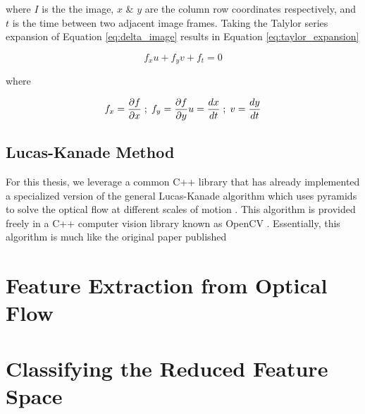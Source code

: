 where $I$ is the the image, $x$ \& $y$ are the column row coordinates respectively,
and $t$ is the time between two adjacent image frames. Taking the Talylor
series expansion of Equation \ref{eq:delta_image} results in Equation \ref{eq:taylor_expansion}


\begin{equation}
f_x u + f_y v + f_t = 0
\label{eq:taylor_expansion}
\end{equation}

where

\begin{equation}
f_x = \frac{\partial f}{\partial x} \; ; \; f_y = \frac{\partial f}{\partial y} \\
u = \frac{dx}{dt} \; ; \; v = \frac{dy}{dt}
\label{eq:taylor_expansion_partial}
\end{equation}


\subsection{\label{subsection:lucas_kanade} Lucas-Kanade Method}
For this thesis, we leverage a common C++ library that has already implemented
a specialized version of the general Lucas-Kanade algorithm which uses pyramids
to solve the optical flow at different scales of motion
 \cite{bouguet2001pyramidal}. This algorithm is provided freely in a C++ computer
 vision library known as OpenCV \cite{itseez2015opencv}. Essentially, this algorithm is much like the original
 paper published


\section{\label{section:feature_extraction}Feature Extraction from Optical Flow}
\section{\label{section:classification}Classifying the Reduced Feature Space}

